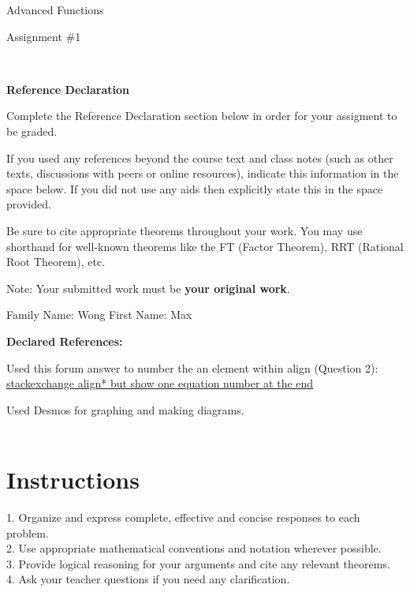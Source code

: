 \documentclass[12pt]{book}
\begin{document}
\vspace{-1.0in}\begin{center}
\Large{Advanced Functions }

\Large{Assignment \#1}


\end{center}


\vspace{0.015in}\hrulefill\ 

\textbf{Reference Declaration} %

Complete the Reference Declaration section below in order for your assigment to be graded.

If you used any references beyond the course text and class notes (such as other texts, discussions with peers or online resources), indicate this information in the space below.  If you did not use any aids then explicitly state this in the space provided. 

Be sure to cite appropriate theorems throughout your work. You may use shorthand for well-known theorems like the FT (Factor Theorem), RRT (Rational Root Theorem), etc. 

Note: Your submitted work must be \textbf{your original work}. 

Family Name: Wong%
First Name: Max%

\textbf{Declared References:} 

Used this forum answer to number the an element within align (Question 2): \\
\href{https://tex.stackexchange.com/questions/42726/align-but-show-one-equation-number-at-the-end}{stackexchange align* but show one equation number at the end}

\vspace{1em}
Used Desmos for graphing and making diagrams. \\


\vspace{0.015in}\hrulefill\ 

\newpage


\section*{Instructions}
\begin{center}
\setlength{\fboxrule}{2pt}
\begin{boxedminipage}{6.5in}
1.	Organize and express complete, effective and concise responses to each problem.\\
2.	Use appropriate mathematical conventions and notation wherever possible.\\
3.	Provide logical reasoning for your arguments and cite any relevant theorems. \\
4.  Ask your teacher questions if you need any clarification.
\end{boxedminipage}
\end{center} 
\end{document}
